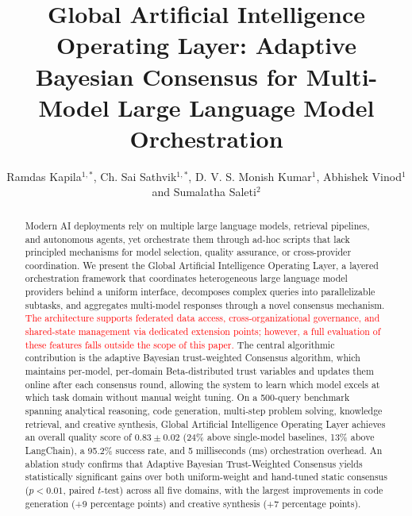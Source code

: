 \documentclass{iopjournal}
\newcommand{\rev}[1]{\textcolor{red}{#1}}
\begin{document}
{\raggedright{}\par}
\title{Global Artificial Intelligence Operating Layer: Adaptive Bayesian Consensus for Multi-Model Large Language Model Orchestration}

\author{Ramdas Kapila$^{1,*}$, Ch. Sai Sathvik$^{1,*}$, D. V. S. Monish Kumar$^1$, Abhishek Vinod$^1$ and Sumalatha Saleti$^2$}






\begin{abstract}
Modern AI deployments rely on multiple large language models, retrieval pipelines, and autonomous agents, yet orchestrate them through ad-hoc scripts that lack principled mechanisms for model selection, quality assurance, or cross-provider coordination. We present the Global Artificial Intelligence Operating Layer, a layered orchestration framework that coordinates heterogeneous large language model providers behind a uniform interface, decomposes complex queries into parallelizable subtasks, and aggregates multi-model responses through a novel consensus mechanism. \rev{The architecture supports federated data access, cross-organizational governance, and shared-state management via dedicated extension points; however, a full evaluation of these features falls outside the scope of this paper.} The central algorithmic contribution is the adaptive Bayesian trust-weighted Consensus algorithm, which maintains per-model, per-domain Beta-distributed trust variables and updates them online after each consensus round, allowing the system to learn which model excels at which task domain without manual weight tuning. On a 500-query benchmark spanning analytical reasoning, code generation, multi-step problem solving, knowledge retrieval, and creative synthesis, Global Artificial Intelligence Operating Layer achieves an overall quality score of $0.83 \pm 0.02$ (24\% above single-model baselines, 13\% above LangChain), a 95.2\% success rate, and 5 milliseconds (ms) orchestration overhead. An ablation study confirms that Adaptive Bayesian Trust-Weighted Consensus yields statistically significant gains over both uniform-weight and hand-tuned static consensus ($p < 0.01$, paired $t$-test) across all five domains, with the largest improvements in code generation (+9 percentage points) and creative synthesis (+7 percentage points).
\end{abstract}
\end{document}
